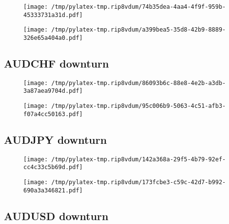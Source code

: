 \documentclass{article}%
\begin{document}
\begin{figure}[htbp]%
\centering%
\texttt{[image: /tmp/pylatex-tmp.rip8vdum/74b35dea-4aa4-4f9f-959b-45333731a31d.pdf]}%
\end{figure}

%


\begin{figure}[htbp]%
\centering%
\texttt{[image: /tmp/pylatex-tmp.rip8vdum/a399bea5-35d8-42b9-8889-326e65a404a0.pdf]}%
\end{figure}

%
\newpage %
\subsection{AUDCHF downturn}%
\label{subsec:AUDCHFdownturn}%


\begin{figure}[htbp]%
\centering%
\texttt{[image: /tmp/pylatex-tmp.rip8vdum/86093b6c-88e8-4e2b-a3db-3a87aea9704d.pdf]}%
\end{figure}

%


\begin{figure}[htbp]%
\centering%
\texttt{[image: /tmp/pylatex-tmp.rip8vdum/95c006b9-5063-4c51-afb3-f07a4cc50163.pdf]}%
\end{figure}

%
\newpage %
\subsection{AUDJPY downturn}%
\label{subsec:AUDJPYdownturn}%


\begin{figure}[htbp]%
\centering%
\texttt{[image: /tmp/pylatex-tmp.rip8vdum/142a368a-29f5-4b79-92ef-cc4c33c5b69d.pdf]}%
\end{figure}

%


\begin{figure}[htbp]%
\centering%
\texttt{[image: /tmp/pylatex-tmp.rip8vdum/173fcbe3-c59c-42d7-b992-690a3a346821.pdf]}%
\end{figure}

%
\newpage %
\subsection{AUDUSD downturn}%
\label{subsec:AUDUSDdownturn}%
\end{document}
